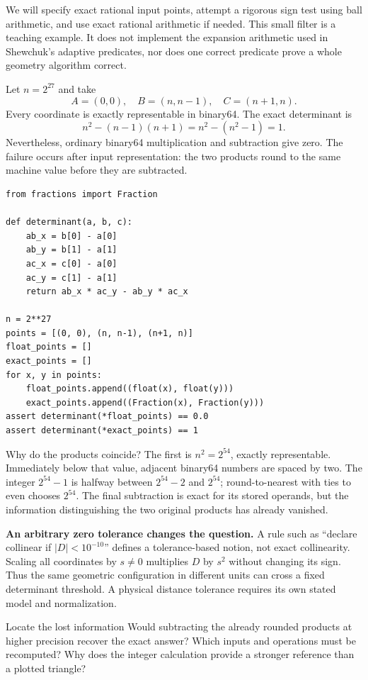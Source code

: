 We will specify exact rational input points, attempt a rigorous sign test
using ball arithmetic, and use exact rational arithmetic if needed. This
small filter is a teaching example. It does not implement the expansion
arithmetic used in Shewchuk's adaptive predicates, nor does one correct
predicate prove a whole geometry algorithm correct.

\newpage
{}
Let $n=2^{27}$ and take
\[
 A=(0,0),\quad B=(n,n-1),\quad C=(n+1,n).
\]
Every coordinate is exactly representable in binary64. The exact determinant is
\[
                   n^2-(n-1)(n+1)=n^2-(n^2-1)=1.
\]
Nevertheless, ordinary binary64 multiplication and subtraction give zero.
The failure occurs after input representation: the two products round to
the same machine value before they are subtracted.
\begin{lstlisting}
from fractions import Fraction

def determinant(a, b, c):
    ab_x = b[0] - a[0]
    ab_y = b[1] - a[1]
    ac_x = c[0] - a[0]
    ac_y = c[1] - a[1]
    return ab_x * ac_y - ab_y * ac_x

n = 2**27
points = [(0, 0), (n, n-1), (n+1, n)]
float_points = []
exact_points = []
for x, y in points:
    float_points.append((float(x), float(y)))
    exact_points.append((Fraction(x), Fraction(y)))
assert determinant(*float_points) == 0.0
assert determinant(*exact_points) == 1
\end{lstlisting}

Why do the products coincide? The first is $n^2=2^{54}$, exactly
representable. Immediately below that value, adjacent binary64 numbers
are spaced by two. The integer $2^{54}-1$ is halfway between
$2^{54}-2$ and $2^{54}$; round-to-nearest with ties to even chooses
$2^{54}$. The final subtraction is exact for its stored operands, but
the information distinguishing the two original products has already vanished.

\textbf{An arbitrary zero tolerance changes the question.} A rule such as
``declare collinear if $|D|<10^{-10}$'' defines a tolerance-based notion,
not exact collinearity. Scaling all coordinates by $s\ne0$ multiplies $D$
by $s^2$ without changing its sign. Thus the same geometric configuration
in different units can cross a fixed determinant threshold. A physical
distance tolerance requires its own stated model and normalization.

\begin{question}{Locate the lost information}
Would subtracting the already rounded products at higher precision recover
the exact answer? Which inputs and operations must be recomputed? Why does
the integer calculation provide a stronger reference than a plotted triangle?
\end{question}

